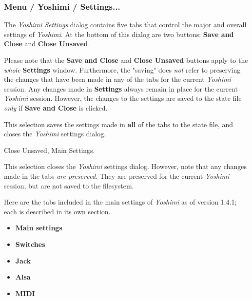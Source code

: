 \fi

\subsubsection{Menu / Yoshimi / Settings...}
\label{subsubsec:menu_yoshimi_settings}

   The \textsl{Yoshimi Settings} dialog contains five tabs that control the
   major and overall settings of \textsl{Yoshimi}.  At the bottom of this
   dialog are two buttons:
   \textbf{Save and Close} and \textbf{Close Unsaved}.

   Please note that the \textbf{Save and Close} and \textbf{Close Unsaved}
   buttons apply to the \textsl{whole}
   \textbf{Settings} window.
   Furthermore, the "saving" does \textsl{not} refer to preserving the changes
   that have been made
   in any of the tabs for the current \textsl{Yoshimi} session.  Any changes
   made in \textbf{Settings} always remain in place for the current
   \textsl{Yoshimi} session.
   However, the changes to the settings are saved to
   the state file \textsl{only} if \textbf{Save and Close} is clicked.

   \setcounter{ItemCounter}{0}      %

   This selection saves the settings made in \textbf{all} of the tabs to the
   state file, and closes the \textsl{Yoshimi} settings dialog.

   Close Unsaved, Main Settings.

   This selection closes the \textsl{Yoshimi} settings dialog.
   However, note that any changes made in the tabs
   \textsl{are preserved}.  They are preserved for the current
   \textsl{Yoshimi} session, but are not saved to the filesystem.

   Here are the tabs included in the main settings of \textsl{Yoshimi}
   as of version 1.4.1; each is described in its own section.

   \begin{itemize}
      \item \textbf{Main settings}
      \item \textbf{Switches}
      \item \textbf{Jack}
      \item \textbf{Alsa}
      \item \textbf{MIDI}
   \end{itemize}

